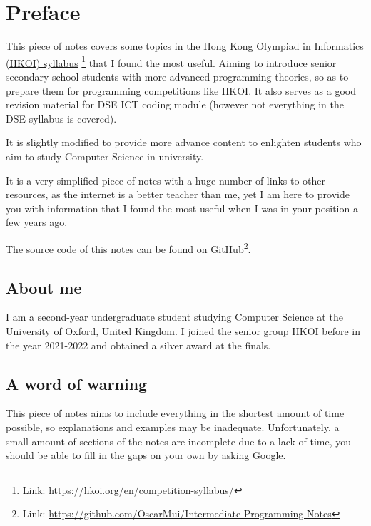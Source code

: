 \chapter*{Preface}

This piece of notes covers some topics in the \href{https://hkoi.org/en/competition-syllabus/}{Hong Kong Olympiad in Informatics (HKOI) syllabus} \footnote{Link: \href{https://hkoi.org/en/competition-syllabus/}{https://hkoi.org/en/competition-syllabus/}} that I found the most useful. Aiming to introduce senior secondary school students with more advanced programming theories, so as to prepare them for programming competitions like HKOI. It also serves as a good revision material for DSE ICT coding module (however not everything in the DSE syllabus is covered).

It is slightly modified to provide more advance content to enlighten students who aim to study Computer Science in university. 

It is a very simplified piece of notes with a huge number of links to other resources, as the internet is a better teacher than me, yet I am here to provide you with information that I found the most useful when I was in your position a few years ago.

The source code of this notes can be found on \href{https://github.com/OscarMui/Intermediate-Programming-Notes}{GitHub}\footnote{Link: \href{https://github.com/OscarMui/Intermediate-Programming-Notes}{https://github.com/OscarMui/Intermediate-Programming-Notes}}.

\section*{About me}

I am a second-year undergraduate student studying Computer Science at the University of Oxford, United Kingdom. I joined the senior group HKOI before in the year 2021-2022 and obtained a silver award at the finals. 

\section*{A word of warning}

This piece of notes aims to include everything in the shortest amount of time possible, so explanations and examples may be inadequate. Unfortunately, a small amount of sections of the notes are incomplete due to a lack of time, you should be able to fill in the gaps on your own by asking Google.

